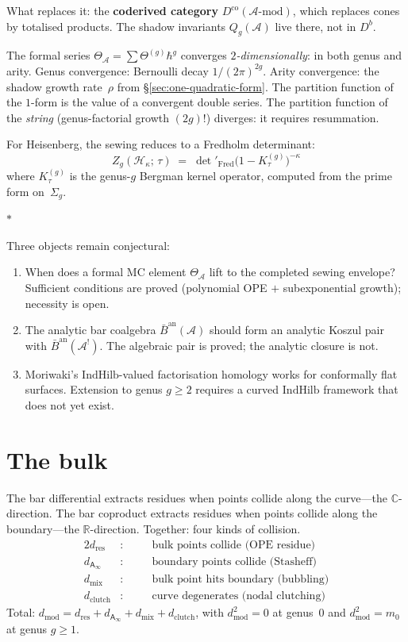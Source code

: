 \documentclass[11pt]{article}
\newcommand{\cA}{\mathcal{A}}
\newcommand{\cH}{\mathcal{H}}
\newcommand{\B}{\bar{B}}
\newcommand{\C}{\mathbb{C}}
\newcommand{\Ainf}{\mathsf{A}_{\infty}}
\newcommand{\sep}{\bigskip\begin{center}$*$\end{center}\medskip}
\begin{document}
What replaces it: the \textbf{coderived category}
$D^{\mathrm{co}}(\cA\text{-mod})$, which replaces cones by
totalised products.  The shadow invariants $Q_g(\cA)$ live
there, not in $D^b$.

The formal series $\Theta_\cA = \sum \Theta^{(g)} \hbar^g$
converges \emph{$2$-dimensionally}: in both genus and arity.
Genus convergence: Bernoulli decay $1/(2\pi)^{2g}$.  Arity
convergence: the shadow growth rate~$\rho$ from
\S\ref{sec:one-quadratic-form}.  The partition function of the
$1$-form is the value of a convergent double series.  The
partition function of the \textit{string} (genus-factorial
growth $(2g)!$) diverges: it requires resummation.

For Heisenberg, the sewing reduces to a Fredholm determinant:
\[
Z_g(\cH_\kappa;\,\tau) \;=\;
\det\nolimits'_{\mathrm{Fred}}
\bigl(1 - K_\tau^{(g)}\bigr)^{-\kappa}
\]
where $K_\tau^{(g)}$ is the genus-$g$ Bergman kernel operator,
computed from the prime form on~$\Sigma_g$.

\sep

Three objects remain conjectural:
\begin{enumerate}[label=(\roman*),nosep]
\item When does a formal MC element $\Theta_\cA$ lift to the
  completed sewing envelope?  Sufficient conditions are proved
  (polynomial OPE $+$ subexponential growth); necessity is open.
\item The analytic bar coalgebra $\B^{\mathrm{an}}(\cA)$
  should form an analytic Koszul pair with
  $\B^{\mathrm{an}}(\cA^!)$.  The algebraic pair is proved;
  the analytic closure is not.
\item Moriwaki's $\mathrm{IndHilb}$-valued factorisation
  homology works for conformally flat surfaces.  Extension to
  genus $g \geq 2$ requires a curved $\mathrm{IndHilb}$
  framework that does not yet exist.
\end{enumerate}


\section{The bulk}
\label{sec:bulk}

The bar differential extracts residues when points collide
along the curve---the $\C$-direction.  The bar coproduct
extracts residues when points collide along the
boundary---the $\mathbb{R}$-direction.  Together: four
kinds of collision.
\begin{alignat*}{2}
d_{\mathrm{res}} &:\quad
  &&\text{bulk points collide (OPE residue)} \\
d_{\Ainf} &:\quad
  &&\text{boundary points collide (Stasheff)} \\
d_{\mathrm{mix}} &:\quad
  &&\text{bulk point hits boundary (bubbling)} \\
d_{\mathrm{clutch}} &:\quad
  &&\text{curve degenerates (nodal clutching)}
\end{alignat*}
Total: $d_{\mathrm{mod}} = d_{\mathrm{res}} + d_{\Ainf}
+ d_{\mathrm{mix}} + d_{\mathrm{clutch}}$, with
$d_{\mathrm{mod}}^2 = 0$ at genus~$0$ and
$d_{\mathrm{mod}}^2 = m_0$ at genus $g \geq 1$.
\end{document}
